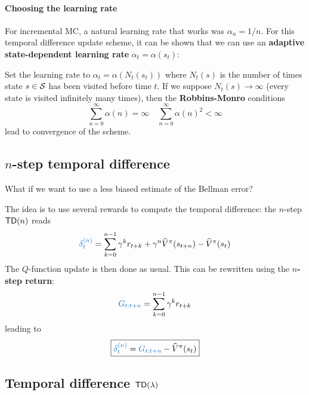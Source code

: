 \documentclass[../course-notes.tex]{subfiles}
\begin{document}
\paragraph{Choosing the learning rate} For incremental MC, a natural learning rate that works was $\alpha_n = 1/n$. For this temporal difference update scheme, it can be shown that we can use an \textbf{adaptive state-dependent learning rate} $\alpha_t = \alpha(s_t)$:
\begin{prop}\label{prop:ValueTD0learningRate}
	Set the learning rate to $\alpha_t = \alpha(N_t(s_t))$ where $N_t(s)$ is the number of times state $s\in\mathcal{S}$ has been visited before time $t$. If we suppose $N_t(s) \to \infty$ (every state is visited infinitely many times), then the \textbf{Robbins-Monro} conditions
	\begin{equation}
	\sum_{n=0}^{\infty} \alpha(n) = \infty \quad
	\sum_{n=0}^{\infty} \alpha(n)^2 < \infty
	\end{equation}
	lead to convergence of the scheme.
\end{prop}



\subsection{\boldmath$n$-step temporal difference \cite[chap.~7]{Sutton1998}}

What if we want to use a less biased estimate of the Bellman error?

The idea is to use several rewards to compute the temporal difference: the $n$-step $\mathsf{TD}(n)$ reads
\begin{equation}
	{\bluefont \delta^{(n)}_t} =
	\sum_{k=0}^{n-1} \gamma^k r_{t+k}
	+ \gamma^n \widehat{V}^\pi(s_{t+n}) - \widehat{V}^\pi(s_t)
\end{equation}
The $Q$-function update is then done as usual.
This can be rewritten using the \textbf{\boldmath $n$-step return}:
\begin{equation}\label{eq:nStepReturn}
	{\bluefont G_{t:t+n}} = \sum_{k=0}^{n-1} \gamma^k r_{t+k}
\end{equation}
leading to
\begin{equation}
\boxed{
	{\bluefont \delta_t^{(n)}} =
	{\bluefont G_{t:t+n}} - \widehat{V}^\pi(s_t)
}\end{equation}



\subsection{\boldmath Temporal difference $\mathsf{TD}(\lambda)$}
\end{document}
